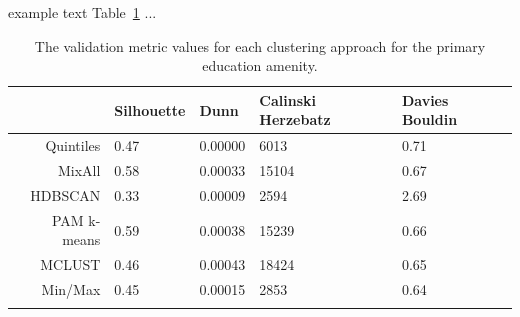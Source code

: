 \documentclass[11pt, a4paper]{article}
\begin{document}
\begin{table}[ht]
\centering
\caption[Number of clusters by approach]{The number of clusters suggested by all approaches for each amenity in the PMD.}\label{numclusts}
\end{table}











example text Table~\ref{prieducmetrics} ...

\begin{longtable}{|r|llll|}
  \hline
 & Silhouette & Dunn & Calinski Herzebatz & Davies Bouldin \\ 
  \hline
Quintiles & 0.47 & 0.00000 &  6013 & 0.71 \\ 
   \hline
MixAll & 0.58 & 0.00033 & 15104 & 0.67 \\ 
   \hline
HDBSCAN & 0.33 & 0.00009 &  2594 & 2.69 \\ 
   \hline
PAM k-means & 0.59 & 0.00038 & 15239 & 0.66 \\ 
   \hline
MCLUST & 0.46 & 0.00043 & 18424 & 0.65 \\ 
   \hline
Min/Max & 0.45 & 0.00015 &  2853 & 0.64 \\ 
   \hline
\caption[Primary education validation metrics]{ The validation metric values for each clustering approach for the primary education amenity.}\label{prieducmetrics} 
\end{longtable}
\end{document}

